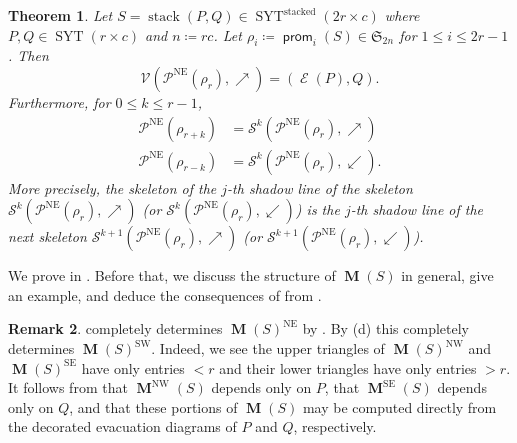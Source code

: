 \documentclass{amsart}
\newtheorem{theorem}{Theorem}[section]
\theoremstyle{definition}
\newtheorem{remark}[theorem]{Remark}
\DeclareMathOperator{\SYT}{SYT}
\DeclareMathOperator{\stack}{stack}
\DeclareMathOperator{\stacked}{stacked}
\DeclareMathOperator{\NE}{NE}
\DeclareMathOperator{\NW}{NW}
\DeclareMathOperator{\SE}{SE}
\DeclareMathOperator{\SW}{SW}
\DeclareMathOperator{\prom}{\mathsf{prom}}
\DeclareMathOperator{\evacuation}{\mathcal{E}}
\DeclareMathOperator{\PM}{\mathbf{M}}
\begin{document}
\begin{theorem}\label{thm:main}
    Let $S = \stack(P, Q) \in \SYT^{\stacked}(2r \times c)$ where $P, Q \in \SYT(r \times c)$ and $n \coloneqq rc$. Let $\rho_i \coloneqq \prom_i(S) \in \mathfrak{S}_{2n}$ for $1 \leq i \leq 2r-1$. Then
    \begin{equation}\label{eq:main-1}
        \mathcal{V}(\mathcal{P}^{\NE}(\rho_r), \nearrow) = (\evacuation(P), Q).
    \end{equation}
    Furthermore, for $0 \leq k \leq r-1$,
    \begin{equation}\label{eq:main-2}
    \begin{split}
        \mathcal{P}^{\NE}(\rho_{r+k}) &= \mathcal{S}^k(\mathcal{P}^{\NE}(\rho_r), \nearrow) \\
        \mathcal{P}^{\NE}(\rho_{r-k}) &= \mathcal{S}^k(\mathcal{P}^{\NE}(\rho_r), \swarrow).
    \end{split}
    \end{equation}
    More precisely, the skeleton of the $j$-th shadow line of the skeleton $\mathcal{S}^k(\mathcal{P}^{\NE}(\rho_r), \nearrow)$ (or $\mathcal{S}^k(\mathcal{P}^{\NE}(\rho_r), \swarrow)$) is the $j$-th shadow line of the next skeleton $\mathcal{S}^{k+1}(\mathcal{P}^{\NE}(\rho_r), \nearrow)$ (or $\mathcal{S}^{k+1}(\mathcal{P}^{\NE}(\rho_r), \swarrow)$).
\end{theorem}

We prove  in . Before that, we discuss the structure of $\PM(S)$ in general, give an example, and deduce the consequences of  from .

\begin{remark}\label{rem:main-structure}
     completely determines $\PM(S)^{\NE}$ by . By (d) this completely determines $\PM(S)^{\SW}$. Indeed, we see the upper triangles of $\PM(S)^{\NW}$ and $\PM(S)^{\SE}$ have only entries $< r$ and their lower triangles have only entries $> r$. It follows from  that $\PM^{\NW}(S)$ depends only on $P$, that $\PM^{\SE}(S)$ depends only on $Q$, and that these portions of $\PM(S)$ may be computed directly from the decorated evacuation diagrams of $P$ and $Q$, respectively.
\end{remark}
\end{document}
